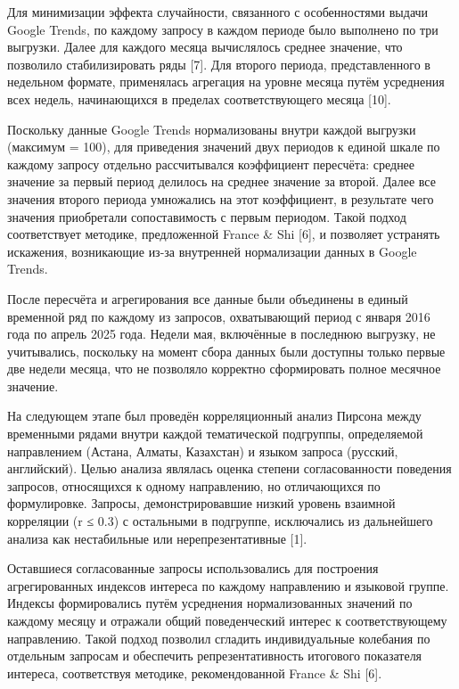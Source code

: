 \begin{multicols}{2}
Для минимизации эффекта случайности, связанного с особенностями выдачи
Google Trends, по каждому запросу в каждом периоде было выполнено по три
выгрузки. Далее для каждого месяца вычислялось среднее значение, что
позволило стабилизировать ряды {[}7{]}. Для второго периода,
представленного в недельном формате, применялась агрегация на уровне
месяца путём усреднения всех недель, начинающихся в пределах
соответствующего месяца {[}10{]}.

Поскольку данные Google Trends нормализованы внутри каждой выгрузки
(максимум = 100), для приведения значений двух периодов к единой шкале
по каждому запросу отдельно рассчитывался коэффициент пересчёта: среднее
значение за первый период делилось на среднее значение за второй. Далее
все значения второго периода умножались на этот коэффициент, в
результате чего значения приобретали сопоставимость с первым периодом.
Такой подход соответствует методике, предложенной France \& Shi {[}6{]},
и позволяет устранять искажения, возникающие из-за внутренней
нормализации данных в Google Trends.

После пересчёта и агрегирования все данные были объединены в единый
временной ряд по каждому из запросов, охватывающий период с января 2016
года по апрель 2025 года. Недели мая, включённые в последнюю выгрузку,
не учитывались, поскольку на момент сбора данных были доступны только
первые две недели месяца, что не позволяло корректно сформировать полное
месячное значение.

На следующем этапе был проведён корреляционный анализ Пирсона между
временными рядами внутри каждой тематической подгруппы, определяемой
направлением (Астана, Алматы, Казахстан) и языком запроса (русский,
английский). Целью анализа являлась оценка степени согласованности
поведения запросов, относящихся к одному направлению, но отличающихся по
формулировке. Запросы, демонстрировавшие низкий уровень взаимной
корреляции (r ≤ 0.3) с остальными в подгруппе, исключались из
дальнейшего анализа как нестабильные или нерепрезентативные {[}1{]}.

Оставшиеся согласованные запросы использовались для построения
агрегированных индексов интереса по каждому направлению и языковой
группе. Индексы формировались путём усреднения нормализованных значений
по каждому месяцу и отражали общий поведенческий интерес к
соответствующему направлению. Такой подход позволил сгладить
индивидуальные колебания по отдельным запросам и обеспечить
репрезентативность итогового показателя интереса, соответствуя методике,
рекомендованной France \& Shi {[}6{]}.


\end{multicols}
